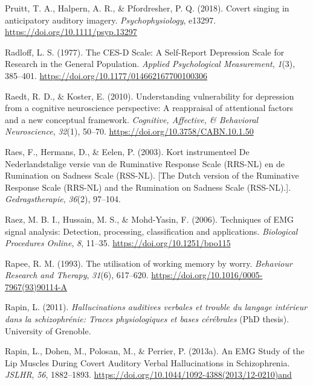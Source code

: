 \documentclass[a4paper,12pt,twoside,openright,oldfontcommands,final]{memoir}
\begin{document}
\leavevmode\hypertarget{ref-pruitt_covert_2018}{}%
Pruitt, T. A., Halpern, A. R., \& Pfordresher, P. Q. (2018). Covert singing in anticipatory auditory imagery. \emph{Psychophysiology}, e13297. \url{https://doi.org/10.1111/psyp.13297}

\leavevmode\hypertarget{ref-radloff_ces-d_1977}{}%
Radloff, L. S. (1977). The CES-D Scale: A Self-Report Depression Scale for Research in the General Population. \emph{Applied Psychological Measurement}, \emph{1}(3), 385--401. \url{https://doi.org/10.1177/014662167700100306}

\leavevmode\hypertarget{ref-Raedt2010}{}%
Raedt, R. D., \& Koster, E. (2010). Understanding vulnerability for depression from a cognitive neuroscience perspective: A reappraisal of attentional factors and a new conceptual framework. \emph{Cognitive, Affective, \& Behavioral Neuroscience}, \emph{32}(1), 50--70. \url{https://doi.org/10.3758/CABN.10.1.50}

\leavevmode\hypertarget{ref-raes_kort_2003}{}%
Raes, F., Hermans, D., \& Eelen, P. (2003). Kort instrumenteel De Nederlandstalige versie van de Ruminative Response Scale (RRS-NL) en de Rumination on Sadness Scale (RSS-NL). {[}The Dutch version of the Ruminative Response Scale (RRS-NL) and the Rumination on Sadness Scale (RSS-NL).{]}. \emph{Gedragstherapie}, \emph{36}(2), 97--104.

\leavevmode\hypertarget{ref-raez_techniques_2006}{}%
Raez, M. B. I., Hussain, M. S., \& Mohd-Yasin, F. (2006). Techniques of EMG signal analysis: Detection, processing, classification and applications. \emph{Biological Procedures Online}, \emph{8}, 11--35. \url{https://doi.org/10.1251/bpo115}

\leavevmode\hypertarget{ref-rapee_utilisation_1993}{}%
Rapee, R. M. (1993). The utilisation of working memory by worry. \emph{Behaviour Research and Therapy}, \emph{31}(6), 617--620. \url{https://doi.org/10.1016/0005-7967(93)90114-A}

\leavevmode\hypertarget{ref-Rapin2011}{}%
Rapin, L. (2011). \emph{Hallucinations auditives verbales et trouble du langage intérieur dans la schizophrénie: Traces physiologiques et bases cérébrales} (PhD thesis). University of Grenoble.

\leavevmode\hypertarget{ref-rapin_emg_2013}{}%
Rapin, L., Dohen, M., Polosan, M., \& Perrier, P. (2013a). An EMG Study of the Lip Muscles During Covert Auditory Verbal Hallucinations in Schizophrenia. \emph{JSLHR}, \emph{56}, 1882--1893. \url{https://doi.org/10.1044/1092-4388(2013/12-0210)and}
\end{document}
